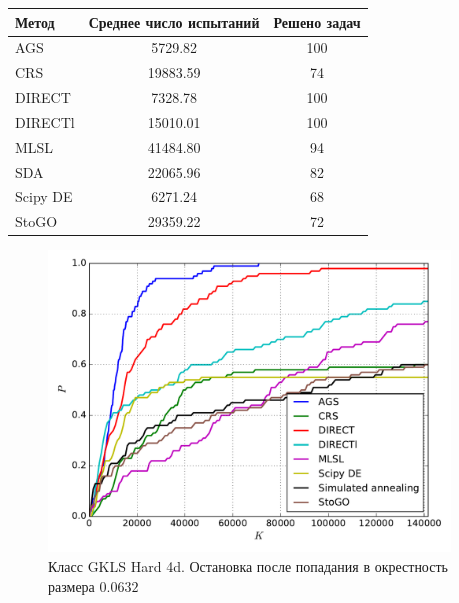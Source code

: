 \documentclass[a4paper]{article}
\begin{document}
\begin{tabular}{lcc}
\hline
 Метод    &  Среднее число испытаний  &  Решено задач  \\
\hline
 AGS      &          5729.82          &      100       \\
 CRS      &         19883.59          &       74       \\
 DIRECT   &          7328.78          &      100       \\
 DIRECTl  &         15010.01          &      100       \\
 MLSL     &         41484.80          &       94       \\
 SDA      &         22065.96          &       82       \\
 Scipy DE &          6271.24          &       68       \\
 StoGO    &         29359.22          &       72       \\
\hline
\end{tabular}
\begin{figure}[H]
  \center
  \includegraphics[width=0.95\textwidth]{../experiments/gklsh4d_serg/cmc.pdf}
  \caption{Класс GKLS Hard 4d. Остановка после попадания в окрестность размера $0.0632$}
  \label{fig:}
\end{figure}
\end{document}
